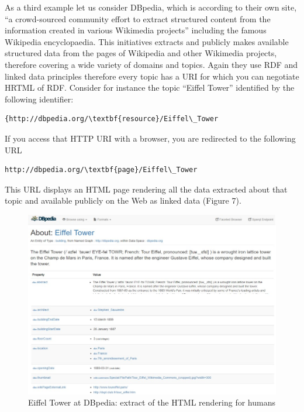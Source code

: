 As a third example let us consider DBpedia, which is according to their
own site, ``a crowd-sourced community effort to extract structured
content from the information created in various Wikimedia projects''
including the famous Wikipedia encyclopaedia. This initiatives extracts
and publicly makes available structured data from the pages of Wikipedia
and other Wikimedia projects, therefore covering a wide variety of
domains and topics. Again they use RDF and linked data principles
therefore every topic has a URI for which you can negotiate HRTML of
RDF. Consider for instance the topic ``Eiffel Tower'' identified by the
following identifier:

\begin{lstlisting}
{http://dbpedia.org/\textbf{resource}/Eiffel\_Tower
\end{lstlisting}

If you access that HTTP URI with a browser, you are redirected to the
following URL

\begin{lstlisting}
http://dbpedia.org/\textbf{page}/Eiffel\_Tower
\end{lstlisting}

This URL displays an HTML page rendering all the data extracted about
that topic and available publicly on the Web as linked data (Figure 7).

\begin{figure}
    \centering
    \includegraphics[width=5in]{media/ch5/figure-05-07.jpg}

    \caption{Eiffel Tower at DBpedia: extract of the HTML rendering for humans}
    \label{fig:ch5.7}
\end{figure}

